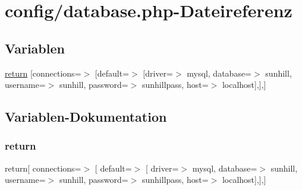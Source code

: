 \hypertarget{database_8php}{}\section{config/database.php-\/\+Dateireferenz}
\label{database_8php}
\subsection*{Variablen}
\begin{DoxyCompactItemize}
\item 
\hyperlink{database_8php_a1e5342c249ca3ddb1a87ba062127b7c9}{return} \mbox{[}\textquotesingle{}connections\textquotesingle{}=$>$ \mbox{[}\textquotesingle{}default\textquotesingle{}=$>$ \mbox{[}\textquotesingle{}driver\textquotesingle{}=$>$ \textquotesingle{}mysql\textquotesingle{}, \textquotesingle{}database\textquotesingle{}=$>$ \textquotesingle{}sunhill\textquotesingle{}, \textquotesingle{}username\textquotesingle{}=$>$ \textquotesingle{}sunhill\textquotesingle{}, \textquotesingle{}password\textquotesingle{}=$>$ \textquotesingle{}sunhillpass\textquotesingle{}, \textquotesingle{}host\textquotesingle{}=$>$ \textquotesingle{}localhost\textquotesingle{}\mbox{]},\mbox{]},\mbox{]}
\end{DoxyCompactItemize}


\subsection{Variablen-\/\+Dokumentation}
\mbox{\label{database_8php_a1e5342c249ca3ddb1a87ba062127b7c9}} 
\subsubsection{\texorpdfstring{return}{return}}
{\footnotesize\ttfamily return\mbox{[} \textquotesingle{}connections\textquotesingle{}=$>$ \mbox{[} \textquotesingle{}default\textquotesingle{}=$>$ \mbox{[} \textquotesingle{}driver\textquotesingle{}=$>$ \textquotesingle{}mysql\textquotesingle{}, \textquotesingle{}database\textquotesingle{}=$>$ \textquotesingle{}sunhill\textquotesingle{}, \textquotesingle{}username\textquotesingle{}=$>$ \textquotesingle{}sunhill\textquotesingle{}, \textquotesingle{}password\textquotesingle{}=$>$ \textquotesingle{}sunhillpass\textquotesingle{}, \textquotesingle{}host\textquotesingle{}=$>$ \textquotesingle{}localhost\textquotesingle{}\mbox{]},\mbox{]},\mbox{]}}


